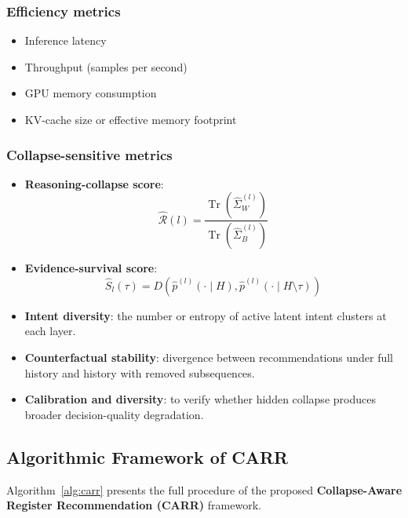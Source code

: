 \documentclass[11pt]{article}
\newcommand{\tr}{\operatorname{Tr}}
\begin{document}
\subsubsection{Efficiency metrics}
\begin{itemize}
    \item Inference latency
    \item Throughput (samples per second)
    \item GPU memory consumption
    \item KV-cache size or effective memory footprint
\end{itemize}

\subsubsection{Collapse-sensitive metrics}
\begin{itemize}
    \item \textbf{Reasoning-collapse score}:
    \[
    \widehat{\mathcal{R}}(l)=
    \frac{\tr(\widehat{\Sigma}_W^{(l)})}{\tr(\widehat{\Sigma}_B^{(l)})}
    \]
    \item \textbf{Evidence-survival score}:
    \[
    \widehat{S}_l(\tau)=
    D\!\left(
    \hat{p}^{(l)}(\cdot \mid H),
    \hat{p}^{(l)}(\cdot \mid H \setminus \tau)
    \right)
    \]
    \item \textbf{Intent diversity}: the number or entropy of active latent intent clusters at each layer.
    \item \textbf{Counterfactual stability}: divergence between recommendations under full history and history with removed subsequences.
    \item \textbf{Calibration and diversity}: to verify whether hidden collapse produces broader decision-quality degradation.
\end{itemize}


\subsection{Algorithmic Framework of CARR}

Algorithm~\ref{alg:carr} presents the full procedure of the proposed \textbf{Collapse-Aware Register Recommendation (CARR)} framework.
\end{document}
